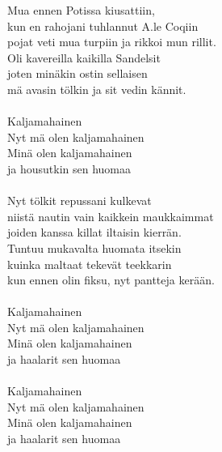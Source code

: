 
            Mua ennen Potissa kiusattiin, \\
            kun en rahojani tuhlannut A.le Coqiin \\
            pojat veti mua turpiin ja rikkoi mun rillit. \\
            Oli kavereilla kaikilla Sandelsit \\
            joten minäkin ostin sellaisen \\
            mä avasin tölkin ja sit vedin kännit. \\
\hspace{10mm} \\
            Kaljamahainen \\
            Nyt mä olen kaljamahainen \\
            Minä olen kaljamahainen \\
            ja housutkin sen huomaa \\
\hspace{10mm} \\
            Nyt tölkit repussani kulkevat \\
            niistä nautin vain kaikkein maukkaimmat \\
            joiden kanssa killat iltaisin kierrän. \\
            Tuntuu mukavalta huomata itsekin \\
            kuinka maltaat tekevät teekkarin \\
            kun ennen olin fiksu, nyt pantteja kerään. \\
\hspace{10mm} \\
            Kaljamahainen \\
            Nyt mä olen kaljamahainen \\
            Minä olen kaljamahainen \\
            ja haalarit sen huomaa \\
\hspace{10mm} \\
            Kaljamahainen \\
            Nyt mä olen kaljamahainen \\
            Minä olen kaljamahainen \\
            ja haalarit sen huomaa \\
